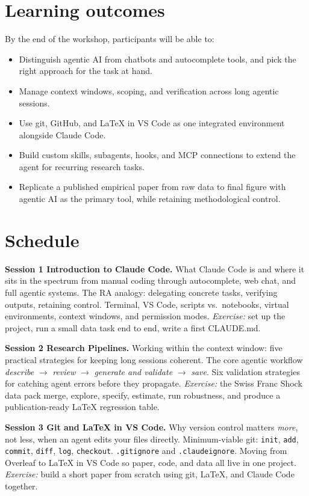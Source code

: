 \documentclass[11pt]{article}
\newcommand{\session}[2]{\textbf{#1.} #2\par\vspace{0.6em}}
\begin{document}
\section*{Learning outcomes}

By the end of the workshop, participants will be able to:
\begin{itemize}[leftmargin=1.2em, itemsep=0.2em, topsep=0.3em]
  \item Distinguish agentic AI from chatbots and autocomplete tools, and pick the right approach for the task at hand.
  \item Manage context windows, scoping, and verification across long agentic sessions.
  \item Use git, GitHub, and LaTeX in VS Code as one integrated environment alongside Claude Code.
  \item Build custom skills, subagents, hooks, and MCP connections to extend the agent for recurring research tasks.
  \item Replicate a published empirical paper from raw data to final figure with agentic AI as the primary tool, while retaining methodological control.
\end{itemize}

\section*{Schedule}

\session{Session 1 \textemdash{} Introduction to Claude Code}{What Claude Code is and where it sits in the spectrum from manual coding through autocomplete, web chat, and full agentic systems. The RA analogy: delegating concrete tasks, verifying outputs, retaining control. Terminal, VS Code, scripts vs.\ notebooks, virtual environments, context windows, and permission modes. \emph{Exercise:} set up the project, run a small data task end to end, write a first CLAUDE.md.}

\session{Session 2 \textemdash{} Research Pipelines}{Working within the context window: five practical strategies for keeping long sessions coherent. The core agentic workflow \textemdash{} \emph{describe} $\rightarrow$ \emph{review} $\rightarrow$ \emph{generate and validate} $\rightarrow$ \emph{save}. Six validation strategies for catching agent errors before they propagate. \emph{Exercise:} the Swiss Franc Shock data pack \textemdash{} merge, explore, specify, estimate, run robustness, and produce a publication-ready LaTeX regression table.}

\session{Session 3 \textemdash{} Git and LaTeX in VS Code}{Why version control matters \emph{more}, not less, when an agent edits your files directly. Minimum-viable git: \texttt{init}, \texttt{add}, \texttt{commit}, \texttt{diff}, \texttt{log}, \texttt{checkout}. \texttt{.gitignore} and \texttt{.claudeignore}. Moving from Overleaf to LaTeX in VS Code so paper, code, and data all live in one project. \emph{Exercise:} build a short paper from scratch using git, LaTeX, and Claude Code together.}
\end{document}
